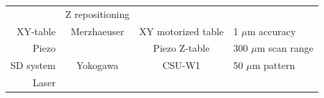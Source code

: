 \documentclass[11pt,singlespacinge,twoside]{reedthesis} %
\theoremstyle{definition}
\theoremstyle{definition}
\theoremstyle{definition}
\theoremstyle{remark}
\begin{document}
\begin{longtable}[]{@{}rccl@{}}
\begin{minipage}[t]{0.23\columnwidth}
\end{minipage} & \begin{minipage}[t]{0.30\columnwidth}\raggedright
Z repositioning\strut
\end{minipage}\tabularnewline
\begin{minipage}[t]{0.20\columnwidth}\raggedleft
XY-table\strut
\end{minipage} & \begin{minipage}[t]{0.16\columnwidth}\centering
Merzhaeuser\strut
\end{minipage} & \begin{minipage}[t]{0.23\columnwidth}\centering
XY motorized table\strut
\end{minipage} & \begin{minipage}[t]{0.30\columnwidth}\raggedright
1 \(\mu\)m accuracy\strut
\end{minipage}\tabularnewline
\begin{minipage}[t]{0.20\columnwidth}\raggedleft
Piezo\strut
\end{minipage} & \begin{minipage}[t]{0.16\columnwidth}\centering
\strut
\end{minipage} & \begin{minipage}[t]{0.23\columnwidth}\centering
Piezo Z-table\strut
\end{minipage} & \begin{minipage}[t]{0.30\columnwidth}\raggedright
300 \(\mu\)m scan range\strut
\end{minipage}\tabularnewline
\begin{minipage}[t]{0.20\columnwidth}\raggedleft
SD system\strut
\end{minipage} & \begin{minipage}[t]{0.16\columnwidth}\centering
Yokogawa\strut
\end{minipage} & \begin{minipage}[t]{0.23\columnwidth}\centering
CSU-W1\strut
\end{minipage} & \begin{minipage}[t]{0.30\columnwidth}\raggedright
50 \(\mu\)m pattern\strut
\end{minipage}\tabularnewline
\begin{minipage}[t]{0.20\columnwidth}\raggedleft
Laser\strut
\end{minipage} & \begin{minipage}[t]{0.16\columnwidth}\centering
\strut
\end{minipage} & \begin{minipage}[t]{0.23\columnwidth}\centering

\end{minipage}
\end{longtable}
\end{document}
